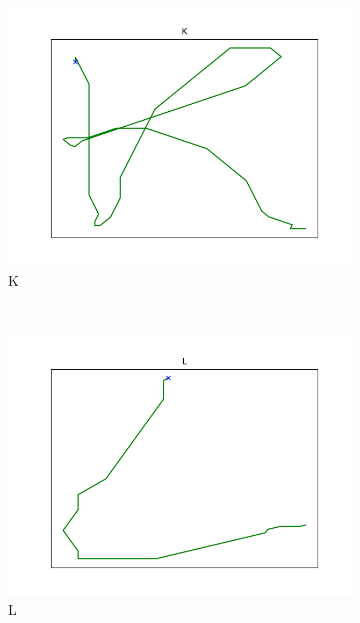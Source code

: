 \begin{figure}
\begin{subfigure}[b]{0.14\textwidth}
        \includegraphics[width=\textwidth]{images/gbem/orig_letters_fig/AORIG_letter_K_writer_4.png}
        \caption{K}
    \end{subfigure}
    ~
    \begin{subfigure}[b]{0.14\textwidth}
        \includegraphics[width=\textwidth]{images/gbem/orig_letters_fig/AORIG_letter_L_writer_16.png}
        \caption{L}
    \end{subfigure}
    ~
    \begin{subfigure}[b]{0.14\textwidth}

\end{subfigure}
\end{figure}
